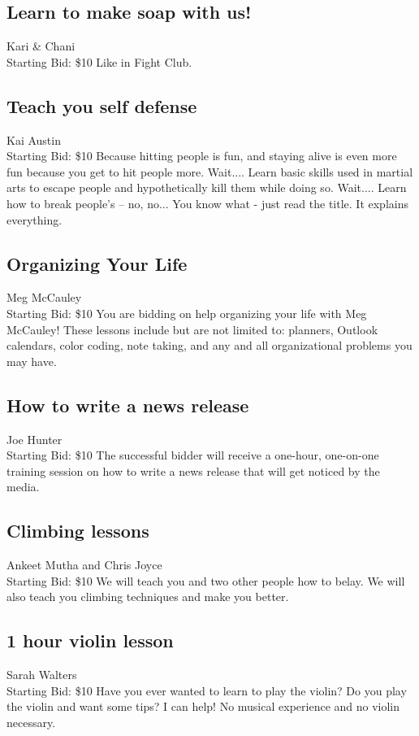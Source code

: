 \documentclass[11pt]{article}
\begin{document}
\subsection{Learn to make soap with us!}
Kari \& Chani
\\
Starting Bid: \$10
\newline
Like in Fight Club.
\subsection{Teach you self defense}
Kai Austin
\\
Starting Bid: \$10
\newline
Because hitting people is fun, and staying alive is even more fun because you get to hit people more. Wait....
Learn basic skills used in martial arts to escape people and hypothetically kill them while doing so. Wait....
Learn how to break people's -- no, no...
You know what - just read the title. It explains everything.
\subsection{Organizing Your Life}
Meg McCauley
\\
Starting Bid: \$10
\newline
You are bidding on help organizing your life with Meg McCauley! These lessons include but are not limited to: planners, Outlook calendars, color coding, note taking, and any and all organizational problems you may have.
\subsection{How to write a news release}
Joe Hunter
\\
Starting Bid: \$10
\newline
The successful bidder will receive a one-hour, one-on-one training session on how to write a news release that will get noticed by the media.
\subsection{Climbing lessons}
Ankeet Mutha and Chris Joyce
\\
Starting Bid: \$10
\newline
We will teach you and two other people how to belay. We will also teach you climbing techniques and make you better.
\subsection{1 hour violin lesson}
Sarah Walters
\\
Starting Bid: \$10
\newline
Have you ever wanted to learn to play the violin? Do you play the violin and want some tips? I can help! No musical experience and no violin necessary.
\end{document}
